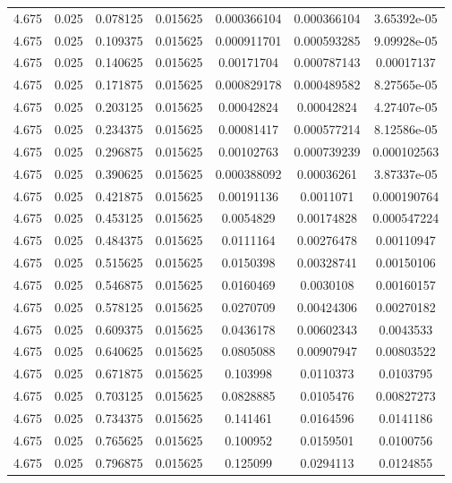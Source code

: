 \begin{table}[bh]
\begin{center}
{\begin{tabular}{ccccccc}
4.675	 & 0.025 & 	0.078125	 & 0.015625	 & 0.000366104	 & 0.000366104	 & 3.65392e-05 \\ 
4.675	 & 0.025 & 	0.109375	 & 0.015625	 & 0.000911701	 & 0.000593285	 & 9.09928e-05 \\ 
4.675	 & 0.025 & 	0.140625	 & 0.015625	 & 0.00171704	 & 0.000787143	 & 0.00017137 \\ 
4.675	 & 0.025 & 	0.171875	 & 0.015625	 & 0.000829178	 & 0.000489582	 & 8.27565e-05 \\ 
4.675	 & 0.025 & 	0.203125	 & 0.015625	 & 0.00042824	 & 0.00042824	 & 4.27407e-05 \\ 
4.675	 & 0.025 & 	0.234375	 & 0.015625	 & 0.00081417	 & 0.000577214	 & 8.12586e-05 \\ 
4.675	 & 0.025 & 	0.296875	 & 0.015625	 & 0.00102763	 & 0.000739239	 & 0.000102563 \\ 
4.675	 & 0.025 & 	0.390625	 & 0.015625	 & 0.000388092	 & 0.00036261	 & 3.87337e-05 \\ 
4.675	 & 0.025 & 	0.421875	 & 0.015625	 & 0.00191136	 & 0.0011071	 & 0.000190764 \\ 
4.675	 & 0.025 & 	0.453125	 & 0.015625	 & 0.0054829	 & 0.00174828	 & 0.000547224 \\ 
4.675	 & 0.025 & 	0.484375	 & 0.015625	 & 0.0111164	 & 0.00276478	 & 0.00110947 \\ 
4.675	 & 0.025 & 	0.515625	 & 0.015625	 & 0.0150398	 & 0.00328741	 & 0.00150106 \\ 
4.675	 & 0.025 & 	0.546875	 & 0.015625	 & 0.0160469	 & 0.0030108	 & 0.00160157 \\ 
4.675	 & 0.025 & 	0.578125	 & 0.015625	 & 0.0270709	 & 0.00424306	 & 0.00270182 \\ 
4.675	 & 0.025 & 	0.609375	 & 0.015625	 & 0.0436178	 & 0.00602343	 & 0.0043533 \\ 
4.675	 & 0.025 & 	0.640625	 & 0.015625	 & 0.0805088	 & 0.00907947	 & 0.00803522 \\ 
4.675	 & 0.025 & 	0.671875	 & 0.015625	 & 0.103998	 & 0.0110373	 & 0.0103795 \\ 
4.675	 & 0.025 & 	0.703125	 & 0.015625	 & 0.0828885	 & 0.0105476	 & 0.00827273 \\ 
4.675	 & 0.025 & 	0.734375	 & 0.015625	 & 0.141461	 & 0.0164596	 & 0.0141186 \\ 
4.675	 & 0.025 & 	0.765625	 & 0.015625	 & 0.100952	 & 0.0159501	 & 0.0100756 \\ 
4.675	 & 0.025 & 	0.796875	 & 0.015625	 & 0.125099	 & 0.0294113	 & 0.0124855 \\ 

\end{tabular}}
\end{center}
\end{table}
